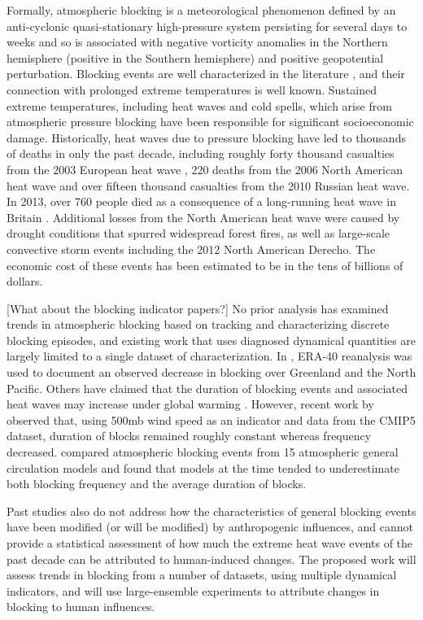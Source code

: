 \documentclass[11pt]{article}
\begin{document}
Formally, atmospheric blocking is a meteorological phenomenon defined by an anti-cyclonic quasi-stationary high-pressure system persisting for several days to weeks and so is associated with negative vorticity anomalies in the Northern hemisphere (positive in the Southern hemisphere) and positive geopotential perturbation.  Blocking events are well characterized in the literature \citep{benzi1986anomalous}, and their connection with prolonged extreme temperatures is well known.  Sustained extreme temperatures, including heat waves and cold spells, which arise from atmospheric pressure blocking have been responsible for significant socioeconomic damage.  Historically, heat waves due to pressure blocking have led to thousands of deaths  in only the past decade, including roughly forty thousand casualties from the 2003 European heat wave \citep{bouchama20042003}, 220 deaths from the 2006 North American heat wave and over fifteen thousand casualties from the 2010 Russian heat wave.  In 2013, over 760 people died as a consequence of a long-running heat wave in Britain \citep{upi2013article}.  Additional losses from the North American heat wave were caused by drought conditions that spurred widespread forest fires, as well as large-scale convective storm events including the 2012 North American Derecho.  The economic cost of these events has been estimated to be in the tens of billions of dollars.

{\color{red}[What about the blocking indicator papers?]}
No prior analysis has examined trends in atmospheric blocking based on tracking and characterizing discrete blocking episodes, and existing work that uses diagnosed dynamical quantities are largely limited to a single dataset of characterization.  In \cite{croci2007multifaceted}, ERA-40 reanalysis was used to document an observed decrease in blocking over Greenland and the North Pacific.  Others have claimed that the duration of blocking events and associated heat waves may increase under global warming \citep{lupo1997climatological, beniston20042003}.  However, recent work by \cite{barnes2012methodology} observed that, using 500mb wind speed as an indicator and data from the CMIP5 dataset, duration of blocks remained roughly constant whereas frequency decreased.  \cite{dandrea1998northern} compared atmospheric blocking events from 15 atmospheric general circulation models and found that models at the time tended to underestimate both blocking frequency and the average duration of blocks.

Past studies also do not address how the characteristics of general blocking events have been modified (or will be modified) by anthropogenic influences, and cannot provide a statistical assessment of how much the extreme heat wave events of the past decade can be attributed to human-induced changes.  The proposed work will assess trends in blocking from a number of datasets, using multiple dynamical indicators, and will use large-ensemble experiments to attribute changes in blocking to human influences.
\end{document}
